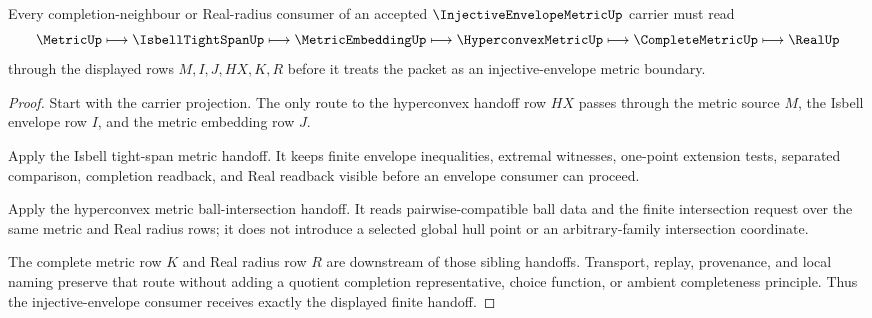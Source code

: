 \begin{theorem}
\label{thm:injective-envelope-metric-hyperconvex-handoff}
Every completion-neighbour or Real-radius consumer of an accepted $\InjectiveEnvelopeMetricUp$ carrier must read
$$
\MetricUp\longmapsto \IsbellTightSpanUp\longmapsto \MetricEmbeddingUp\longmapsto \HyperconvexMetricUp\longmapsto \CompleteMetricUp\longmapsto \RealUp
$$
through the displayed rows $M,I,J,HX,K,R$ before it treats the packet as an injective-envelope metric boundary.
\end{theorem}
\begin{proof}
Start with the carrier projection. The only route to the hyperconvex handoff row $HX$ passes through the metric source $M$, the Isbell envelope row $I$, and the metric embedding row $J$.

Apply the Isbell tight-span metric handoff. It keeps finite envelope inequalities, extremal witnesses, one-point extension tests, separated comparison, completion readback, and Real readback visible before an envelope consumer can proceed.

Apply the hyperconvex metric ball-intersection handoff. It reads pairwise-compatible ball data and the finite intersection request over the same metric and Real radius rows; it does not introduce a selected global hull point or an arbitrary-family intersection coordinate.

The complete metric row $K$ and Real radius row $R$ are downstream of those sibling handoffs. Transport, replay, provenance, and local naming preserve that route without adding a quotient completion representative, choice function, or ambient completeness principle. Thus the injective-envelope consumer receives exactly the displayed finite handoff.
\end{proof}



